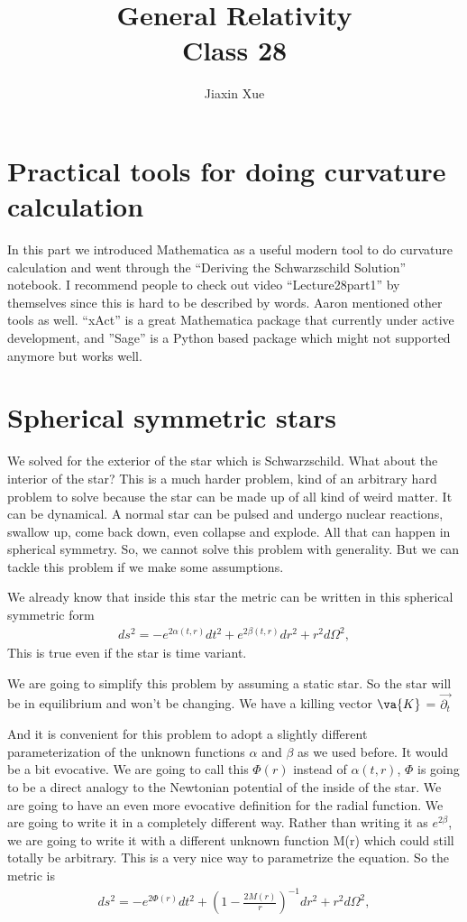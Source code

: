 \documentclass[10pt]{article}
\title{{\Huge General Relativity}\\{\Large{Class 28}}} %
\author{Jiaxin Xue}
\begin{document}
    \maketitle
    \flushbottom
    \newpage
    \pagestyle{fancynotes}
    \part{Practical tools for doing curvature calculation}
	In this part we introduced Mathematica as a useful modern tool to do curvature calculation and went through the “Deriving the Schwarzschild Solution” notebook. I recommend people to check out video “Lecture28part1” by themselves since this is hard to be described by words. Aaron mentioned other tools as well. “xAct” is a great Mathematica package that currently under active development, and ”Sage” is a Python based package which might not supported anymore but works well.
	\newpage
	\part{Spherical symmetric stars}
	We solved for the exterior of the star which is Schwarzschild. What about the interior of the star? This is a much harder problem, kind of an arbitrary hard problem to solve because the star can be made up of all kind of weird matter. It can be dynamical. A normal star can be pulsed and undergo nuclear reactions, swallow up, come back down, even collapse and explode. All that can happen in spherical symmetry. So, we cannot solve this problem with generality. But we can tackle this problem if we make some assumptions. 
	
	We already know that inside this star the metric can be written in this spherical symmetric form
\begin{align}\label{GenMet2}
                ds^2 = -e^{2\alpha(t,r)}dt^2+e^{2\beta(t,r)}dr^2 +
                r^2d\Omega^2,
            \end{align}
This is true even if the star is time variant.

We are going to simplify this problem by assuming a static star. So the star will be in equilibrium and won’t be changing. We have a killing vector
$\va{K}$ = $\vec{\partial_t} $

And it is convenient for this problem to adopt a slightly different parameterization of the unknown functions $\alpha$ and $\beta$ as we used before. It would be a bit evocative. We are going to call this $\Phi(r)$ instead of $\alpha(t,r)$, $\Phi$ is going to be a direct analogy to the Newtonian potential of the inside of the star. We are going to have an even more evocative definition for the radial function. We are going to write it in a completely different way. Rather than writing it as $e^{2\beta}$, we are going to write it with a different unknown function M(r) which could still totally be arbitrary. This is a very nice way to parametrize the equation. So the metric is 
\begin{align}\label{GenMet2}
                ds^2 = -e^{2\Phi(r)}dt^2+(1-\frac{2M(r)}{r})^{-1}dr^2 +
                r^2d\Omega^2,
            \end{align}
\end{document}
